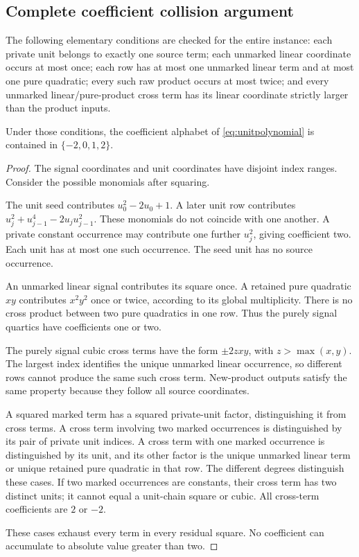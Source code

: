 \subsection{Complete coefficient collision argument}

The following elementary conditions are checked for the entire instance: each private unit belongs to exactly one source term; each unmarked linear coordinate occurs at most once; each row has at most one unmarked linear term and at most one pure quadratic; every such raw product occurs at most twice; and every unmarked linear/pure-product cross term has its linear coordinate strictly larger than the product inputs.

\begin{proposition}\label{prop:heighttwo}
Under those conditions, the coefficient alphabet of \eqref{eq:unitpolynomial} is contained in \(\{-2,0,1,2\}\).
\end{proposition}
\begin{proof}
The signal coordinates and unit coordinates have disjoint index ranges. Consider the possible monomials after squaring.

The unit seed contributes \(u_0^2-2u_0+1\). A later unit row contributes \(u_j^2+u_{j-1}^4-2u_ju_{j-1}^2\). These monomials do not coincide with one another. A private constant occurrence may contribute one further \(u_j^2\), giving coefficient two. Each unit has at most one such occurrence. The seed unit has no source occurrence.

An unmarked linear signal contributes its square once. A retained pure quadratic \(xy\) contributes \(x^2y^2\) once or twice, according to its global multiplicity. There is no cross product between two pure quadratics in one row. Thus the purely signal quartics have coefficients one or two.

The purely signal cubic cross terms have the form \(\pm2zxy\), with \(z>\max(x,y)\). The largest index identifies the unique unmarked linear occurrence, so different rows cannot produce the same such cross term. New-product outputs satisfy the same property because they follow all source coordinates.

A squared marked term has a squared private-unit factor, distinguishing it from cross terms. A cross term involving two marked occurrences is distinguished by its pair of private unit indices. A cross term with one marked occurrence is distinguished by its unit, and its other factor is the unique unmarked linear term or unique retained pure quadratic in that row. The different degrees distinguish these cases. If two marked occurrences are constants, their cross term has two distinct units; it cannot equal a unit-chain square or cubic. All cross-term coefficients are \(2\) or \(-2\).

These cases exhaust every term in every residual square. No coefficient can accumulate to absolute value greater than two.
\end{proof}

